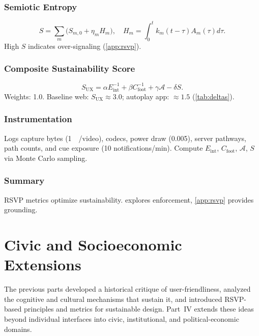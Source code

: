 \documentclass[openany]{book}
\newcommand{\Sent}{S} %
\newcommand{\Eint}{E_{\mathrm{int}}} %
\newcommand{\Cfoot}{C_{\mathrm{foot}}} %
\newcommand{\Auton}{\mathcal{A}} %
\newcommand{\SUX}{S_{\mathrm{UX}}} %
\newcommand{\kWh}{\mathrm{kWh}}
\begin{document}
\section{Semiotic Entropy}
\label{sec:metrics-entropy}
\begin{equation}
\label{eq:metrics-S}
\Sent = \sum_m \big(S_{m,0} + \eta_m H_m\big), \quad H_m = \int_0^t k_m(t-\tau) A_m(\tau) d\tau.
\end{equation}
High \(\Sent\) indicates over-signaling (\cref{app:rsvp}).

\section{Composite Sustainability Score}
\label{sec:metrics-composite}
\begin{equation}
\label{eq:metrics-SUX}
\SUX = \alpha \Eint^{-1} + \beta \Cfoot^{-1} + \gamma \Auton - \delta \Sent.
\end{equation}
Weights: 1.0. Baseline web: \(\SUX \approx 3.0\); autoplay app: \(\approx 1.5\) (\cref{tab:deltas}).

\section{Instrumentation}
\label{sec:instrumentation}
Logs capture bytes (\SI{1}{\mega\byte}/video), codecs, power draw (\SI{0.005}{\kWh}), server pathways, path counts, and cue exposure (10 notifications/min). Compute \(\Eint\), \(\Cfoot\), \(\Auton\), \(\Sent\) via Monte Carlo sampling.

\section{Summary}
RSVP metrics optimize sustainability.  explores enforcement, \cref{app:rsvp} provides grounding.

\part{Civic and Socioeconomic Extensions}
The previous parts developed a historical critique of user-friendliness,
analyzed the cognitive and cultural mechanisms that sustain it, and
introduced RSVP-based principles and metrics for sustainable design.
Part~IV extends these ideas beyond individual interfaces into civic,
institutional, and political-economic domains.
\end{document}
